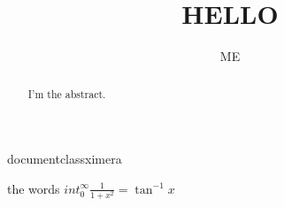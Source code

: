 documentclass{ximera}
\title{HELLO}
\author{ME}


\begin{abstract}

I'm the abstract.
\end{abstract}
\maketitle

the words $int_0^{\infty}\frac{1}{1+x^2}=\tan^{-1}x$

